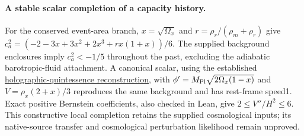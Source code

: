 \paragraph{A stable scalar completion of a capacity history.}
For the conserved event-area branch, $x=\sqrt{\Omega_x}$ and
$r=\rho_r/(\rho_m+\rho_r)$ give
$c_a^2=(-2-3x+3x^2+2x^3+rx(1+x))/6$.
The supplied background enclosures imply $c_a^2<-1/5$ throughout the past,
excluding the adiabatic barotropic-fluid attachment. A canonical scalar,
using the established
\href{https://arxiv.org/abs/astro-ph/0604484}{holographic-quintessence reconstruction},
with $\phi'=M_{\rm Pl}\sqrt{2\Omega_x(1-x)}$ and
$V=\rho_x(2+x)/3$ reproduces the same background and has rest-frame speed1.
Exact positive Bernstein coefficients, also checked in Lean, give
$2\le V''/H^2\le6$. This constructive local completion retains the
supplied cosmological inputs; its native-source transfer and cosmological
perturbation likelihood remain unproved.
